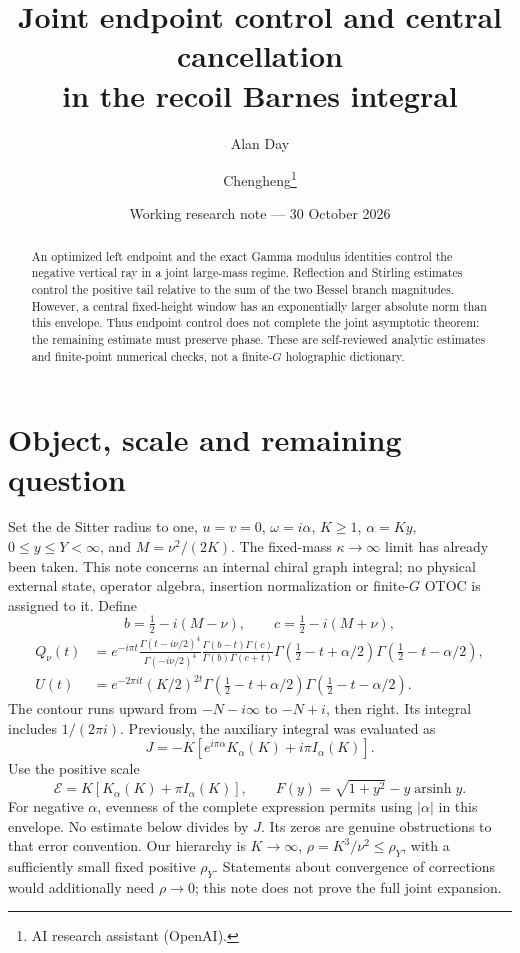 \documentclass[11pt,a4paper]{article}
\title{Joint endpoint control and central cancellation\\in the recoil Barnes integral}
\author{Alan Day \and Chengheng\thanks{AI research assistant (OpenAI).}}
\date{Working research note --- 30 October 2026}
\newcommand{\E}{\mathcal E}
\begin{document}
\maketitle
\begin{abstract}
An optimized left endpoint and the exact Gamma modulus identities
control the negative vertical ray in a joint large-mass regime.
Reflection and Stirling estimates control the positive tail relative
to the sum of the two Bessel branch magnitudes. However, a central
fixed-height window has an exponentially larger absolute norm than
this envelope. Thus endpoint control does not complete the joint
asymptotic theorem: the remaining estimate must preserve phase.
These are self-reviewed analytic estimates and finite-point numerical
checks, not a finite-\(G\) holographic dictionary.
\end{abstract}

\section{Object, scale and remaining question}
Set the de Sitter radius to one, \(u=v=0\), \(\omega=i\alpha\),
\(K\ge1\), \(\alpha=Ky\), \(0\le y\le Y<\infty\), and
\(M=\nu^2/(2K)\). The fixed-mass \(\kappa\to\infty\) limit has already
been taken. This note concerns an internal chiral graph integral;
no physical external state, operator algebra, insertion normalization
or finite-\(G\) OTOC is assigned to it. Define
\[
 b=\tfrac12-i(M-\nu),\qquad c=\tfrac12-i(M+\nu),
\]
\begin{align}
 Q_\nu(t)&=e^{-i\pi t}
 \frac{\Gamma(t-i\nu/2)^4}{\Gamma(-i\nu/2)^4}
 \frac{\Gamma(b-t)\Gamma(c)}{\Gamma(b)\Gamma(c+t)}
 \Gamma(\tfrac12-t+\alpha/2)\Gamma(\tfrac12-t-\alpha/2),\\
 U(t)&=e^{-2\pi it}(K/2)^{2t}
 \Gamma(\tfrac12-t+\alpha/2)\Gamma(\tfrac12-t-\alpha/2).
\end{align}
The contour runs upward from \(-N-i\infty\) to \(-N+i\),
then right. Its integral includes \(1/(2\pi i)\). Previously,
the auxiliary integral was evaluated as
\[
 J=-K[e^{i\pi\alpha}K_\alpha(K)+i\pi I_\alpha(K)].
\]
Use the positive scale
\[
 \E=K[K_\alpha(K)+\pi I_\alpha(K)],\qquad
 F(y)=\sqrt{1+y^2}-y\operatorname{arsinh}y.
\]
For negative \(\alpha\), evenness of the complete expression permits
using \(|\alpha|\) in this envelope. No estimate below divides by \(J\).
Its zeros are genuine obstructions to that error convention.
Our hierarchy is \(K\to\infty\), \(\rho=K^3/\nu^2\le\rho_Y\),
with a sufficiently small fixed positive \(\rho_Y\).
Statements about convergence of corrections would additionally need
\(\rho\to0\); this note does not prove the full joint expansion.
\end{document}
